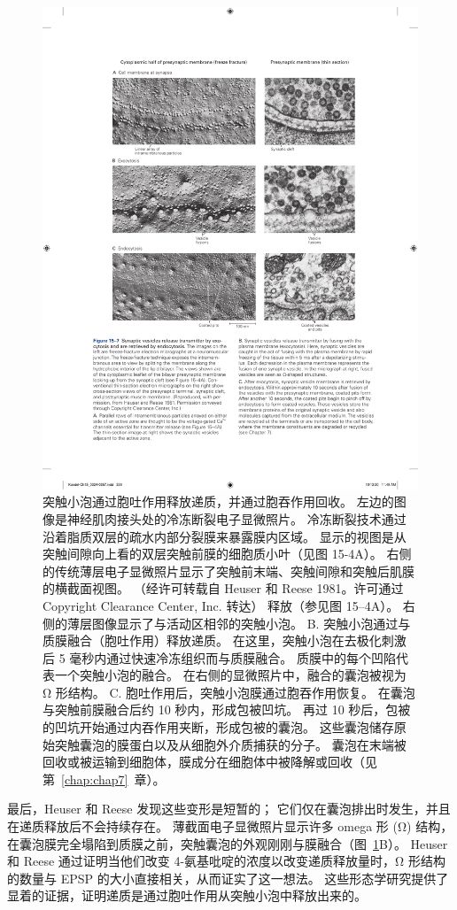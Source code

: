 \begin{figure}[htbp]
	\centering
	\includegraphics[width=0.8\linewidth]{chap15/fig_15_7}
	\caption{突触小泡通过胞吐作用释放递质，并通过胞吞作用回收。 左边的图像是神经肌肉接头处的冷冻断裂电子显微照片。 冷冻断裂技术通过沿着脂质双层的疏水内部分裂膜来暴露膜内区域。 显示的视图是从突触间隙向上看的双层突触前膜的细胞质小叶（见图 15-4A）。 右侧的传统薄层电子显微照片显示了突触前末端、突触间隙和突触后肌膜的横截面视图。 （经许可转载自 Heuser 和 Reese 1981。许可通过 Copyright Clearance Center, Inc. 转达） 释放（参见图 15–4A）。 右侧的薄层图像显示了与活动区相邻的突触小泡。 B. 突触小泡通过与质膜融合（胞吐作用）释放递质。 在这里，突触小泡在去极化刺激后 5 毫秒内通过快速冷冻组织而与质膜融合。 质膜中的每个凹陷代表一个突触小泡的融合。 在右侧的显微照片中，融合的囊泡被视为 Ω 形结构。 C. 胞吐作用后，突触小泡膜通过胞吞作用恢复。 在囊泡与突触前膜融合后约 10 秒内，形成包被凹坑。 再过 10 秒后，包被的凹坑开始通过内吞作用夹断，形成包被的囊泡。 这些囊泡储存原始突触囊泡的膜蛋白以及从细胞外介质捕获的分子。 囊泡在末端被回收或被运输到细胞体，膜成分在细胞体中被降解或回收（见第~\ref{chap:chap7}~章）。}
	\label{fig:15_7}
\end{figure}


最后，Heuser 和 Reese 发现这些变形是短暂的；
它们仅在囊泡排出时发生，并且在递质释放后不会持续存在。
薄截面电子显微照片显示许多 omega 形 (Ω) 结构，在囊泡膜完全塌陷到质膜之前，突触囊泡的外观刚刚与膜融合（图~\ref{fig:15_7}B）。
Heuser 和 Reese 通过证明当他们改变 4-氨基吡啶的浓度以改变递质释放量时，Ω 形结构的数量与 EPSP 的大小直接相关，从而证实了这一想法。
这些形态学研究提供了显着的证据，证明递质是通过胞吐作用从突触小泡中释放出来的。


